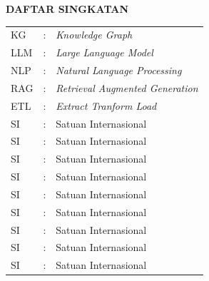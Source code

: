 \clearpage
{}
{}

\begin{center}
    \large \textbf{DAFTAR SINGKATAN}
\end{center}
\vspace{3em}

\begin{center}
    \begin{table}[htbp]
        \begin{tabular}{l l l}
            KG              &:& \textit{Knowledge Graph} 				\\ %
            LLM             &:& \textit{Large Language Model}			\\ %
            NLP             &:& \textit{Natural Language Processing}	\\ %
            RAG             &:& \textit{Retrieval Augmented Generation}	\\ %
            ETL             &:& \textit{Extract Tranform Load}			\\ %
            SI              &:& Satuan Internasional             		\\ %
            SI              &:& Satuan Internasional             		\\ %
            SI              &:& Satuan Internasional             		\\ %
            SI              &:& Satuan Internasional             		\\ %
            SI              &:& Satuan Internasional             		\\ %
            SI              &:& Satuan Internasional             		\\ %
            SI              &:& Satuan Internasional             		\\ %
            SI              &:& Satuan Internasional             		\\ %
            SI              &:& Satuan Internasional             		\\
        \end{tabular}
    \end{table}
\end{center}


